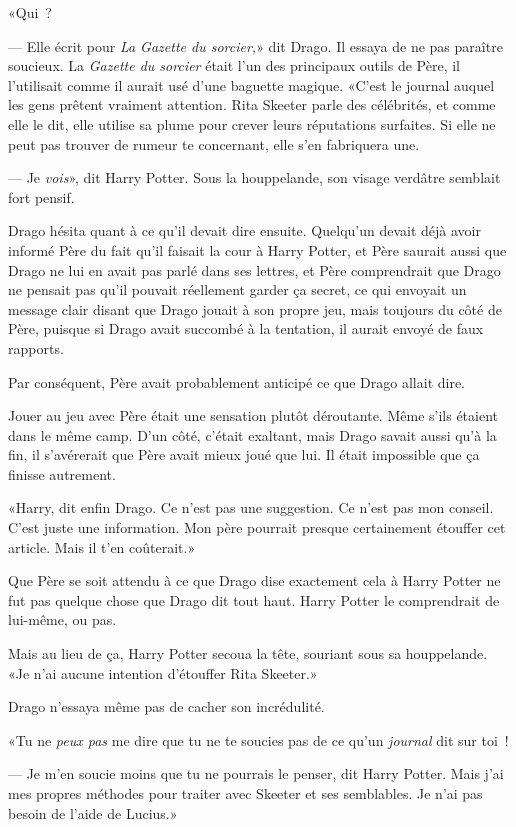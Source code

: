 «Qui~?

--- Elle écrit pour \emph{La Gazette du sorcier,}» dit Drago. Il essaya de ne pas paraître soucieux. La \emph{Gazette du sorcier} était l'un des principaux outils de Père, il l'utilisait comme il aurait usé d'une baguette magique. «C'est le journal auquel les gens prêtent vraiment attention. Rita Skeeter parle des célébrités, et comme elle le dit, elle utilise sa plume pour crever leurs réputations surfaites. Si elle ne peut pas trouver de rumeur te concernant, elle s'en fabriquera une.

--- Je \emph{vois}», dit Harry Potter. Sous la houppelande, son visage verdâtre semblait fort pensif.

Drago hésita quant à ce qu'il devait dire ensuite. Quelqu'un devait déjà avoir informé Père du fait qu'il faisait la cour à Harry Potter, et Père saurait aussi que Drago ne lui en avait pas parlé dans ses lettres, et Père comprendrait que Drago ne pensait pas qu'il pouvait réellement garder ça secret, ce qui envoyait un message clair disant que Drago jouait à son propre jeu, mais toujours du côté de Père, puisque si Drago avait succombé à la tentation, il aurait envoyé de faux rapports.

Par conséquent, Père avait probablement anticipé ce que Drago allait dire.

Jouer au jeu avec Père était une sensation plutôt déroutante. Même s'ils étaient dans le même camp. D'un côté, c'était exaltant, mais Drago savait aussi qu'à la fin, il s'avérerait que Père avait mieux joué que lui. Il était impossible que ça finisse autrement.

«Harry, dit enfin Drago. Ce n'est pas une suggestion. Ce n'est pas mon conseil. C'est juste une information. Mon père pourrait presque certainement étouffer cet article. Mais il t'en coûterait.»

Que Père se soit attendu à ce que Drago dise exactement cela à Harry Potter ne fut pas quelque chose que Drago dit tout haut. Harry Potter le comprendrait de lui-même, ou pas.

Mais au lieu de ça, Harry Potter secoua la tête, souriant sous sa houppelande. «Je n'ai aucune intention d'étouffer Rita Skeeter.»

Drago n'essaya même pas de cacher son incrédulité.

«Tu ne \emph{peux pas} me dire que tu ne te soucies pas de ce qu'un \emph{journal} dit sur toi~!

--- Je m'en soucie moins que tu ne pourrais le penser, dit Harry Potter. Mais j'ai mes propres méthodes pour traiter avec Skeeter et ses semblables. Je n'ai pas besoin de l'aide de Lucius.»

